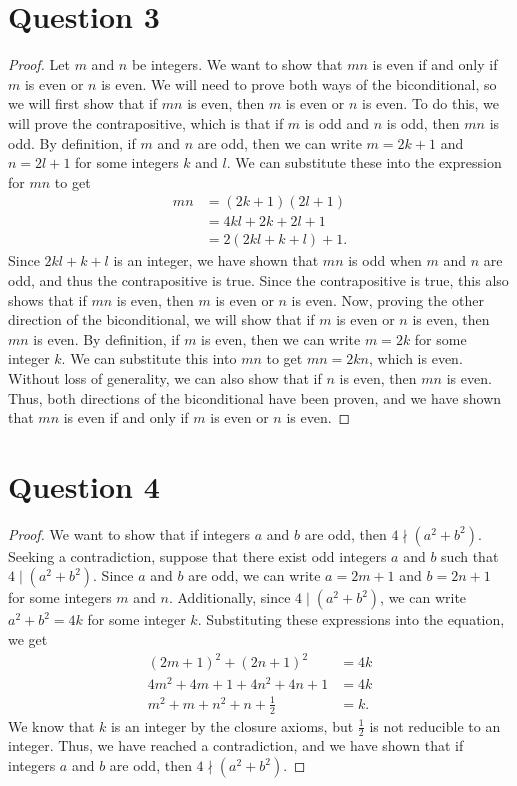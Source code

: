 \documentclass{article}
\begin{document}
\section*{Question 3}
\begin{proof}
    Let $m$ and $n$ be integers.
    We want to show that $mn$ is even if and only if $m$ is even or $n$ is even.
    We will need to prove both ways of the biconditional, so we will first show that 
    if $mn$ is even, then $m$ is even or $n$ is even.
    To do this, we will prove the contrapositive, which is that if $m$ is odd and $n$ is odd, then $mn$ is odd.
    By definition, if $m$ and $n$ are odd, then we can write $m = 2k + 1$ and $n = 2l + 1$ for some integers $k$ and $l$.
    We can substitute these into the expression for $mn$ to get
    \begin{align*}
        mn &= (2k + 1)(2l + 1) \\
        &= 4kl + 2k + 2l + 1 \\
        &= 2(2kl + k + l) + 1.
    \end{align*}
    Since $2kl + k + l$ is an integer, we have shown that $mn$ is odd when $m$ and $n$ are odd,
    and thus the contrapositive is true.
    Since the contrapositive is true, this also shows that if $mn$ is even, then $m$ is even or $n$ is even.
    Now, proving the other direction of the biconditional, we will show that if $m$ is even or $n$ is even, then $mn$ is even.
    By definition, if $m$ is even, then we can write $m = 2k$ for some integer $k$.
    We can substitute this into $mn$ to get $mn = 2kn$, which is even.
    Without loss of generality, we can also show that if $n$ is even, then $mn$ is even.
    Thus, both directions of the biconditional have been proven, and we have shown that $mn$ is even if and only if $m$ is even or $n$ is even.
\end{proof}

\section*{Question 4}
\begin{proof}
    We want to show that if integers $a$ and $b$ are odd, then $4 \nmid (a^2 + b^2)$.
    Seeking a contradiction, suppose that there exist odd integers $a$ and $b$ such that $4 \mid (a^2 + b^2)$.
    Since $a$ and $b$ are odd, we can write $a = 2m + 1$ and $b = 2n + 1$ for some integers $m$ and $n$.
    Additionally, since $4 \mid (a^2 + b^2)$, we can write $a^2 + b^2 = 4k$ for some integer $k$.
    Substituting these expressions into the equation, we get
    \begin{align*}
        (2m + 1)^2 + (2n + 1)^2 &= 4k \\
        4m^2 + 4m + 1 + 4n^2 + 4n + 1 &= 4k \\
        m^2 + m + n^2 + n + \frac{1}{2} &= k.
    \end{align*}
    We know that $k$ is an integer by the closure axioms, but $\frac{1}{2}$ is not reducible to an integer.
    Thus, we have reached a contradiction, and we have shown that if integers $a$ and $b$ are odd, then $4 \nmid (a^2 + b^2)$.
\end{proof}
\end{document}
